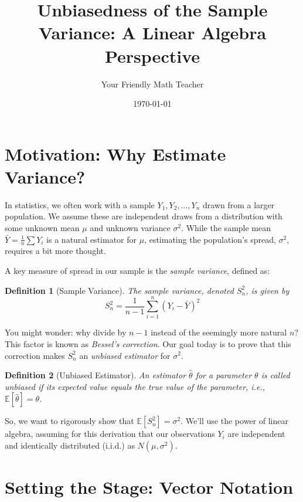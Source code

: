 \documentclass[11pt]{article}
\title{Unbiasedness of the Sample Variance: A Linear Algebra Perspective}
\author{Your Friendly Math Teacher}
\date{\today}
\newcommand{\E}{\mathbb{E}} %
\newtheorem{definition}{Definition}
\begin{document}
\maketitle

\section{Motivation: Why Estimate Variance?}

In statistics, we often work with a sample $Y_1, Y_2, \dots, Y_n$ drawn from a larger population. We assume these are independent draws from a distribution with some unknown mean $\mu$ and unknown variance $\sigma^2$. While the sample mean $\bar{Y} = \frac{1}{n}\sum Y_i$ is a natural estimator for $\mu$, estimating the population's spread, $\sigma^2$, requires a bit more thought.

A key measure of spread in our sample is the \emph{sample variance}, defined as:
\begin{definition}[Sample Variance]
The sample variance, denoted $S_n^2$, is given by
\[
S_n^2 = \frac{1}{n-1} \sum_{i=1}^n (Y_i - \bar{Y})^2
\]
\end{definition}
You might wonder: why divide by $n-1$ instead of the seemingly more natural $n$? This factor is known as \emph{Bessel's correction}. Our goal today is to prove that this correction makes $S_n^2$ an \emph{unbiased estimator} for $\sigma^2$.

\begin{definition}[Unbiased Estimator]
An estimator $\hat{\theta}$ for a parameter $\theta$ is called unbiased if its expected value equals the true value of the parameter, i.e., $\E[\hat{\theta}] = \theta$.
\end{definition}

So, we want to rigorously show that $\E[S_n^2] = \sigma^2$. We'll use the power of linear algebra, assuming for this derivation that our observations $Y_i$ are independent and identically distributed (i.i.d.) as $N(\mu, \sigma^2)$.

\section{Setting the Stage: Vector Notation}
\end{document}
